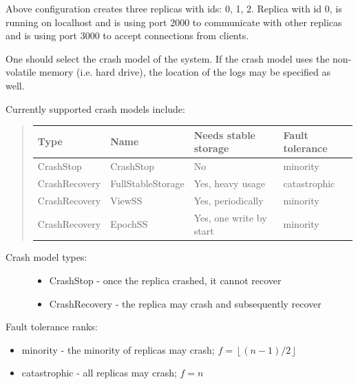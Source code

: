 Above configuration creates three replicas with ids: 0, 1, 2. Replica with id 0,
is running on localhost and is using port 2000 to communicate with other replicas
and is using port 3000 to accept connections from clients.


\label{config:crash-model-selection}
One should select the crash model of the system. If the crash model uses the
non-volatile memory (i.e. hard drive), the location of the logs may be
specified as well.

Currently supported crash models include:
\begin{quote}

\begin{tabular}{|L|L|L|L|}
\hline
\textbf{
Type
} & \textbf{
Name
} & \textbf{
Needs stable storage
} & \textbf{
Fault tolerance
}\\
\hline

CrashStop
 & 
CrashStop
 & 
No
 & 
minority
\\

CrashRecovery
 & 
FullStableStorage
 & 
Yes, heavy usage
 & 
catastrophic
\\

CrashRecovery
 & 
ViewSS
 & 
Yes, periodically
 & 
minority
\\

CrashRecovery
 & 
EpochSS
 & 
Yes, one write by start
 & 
minority
\\
\hline
\end{tabular}

\end{quote}
\begin{description}
\item[{Crash model types:}] \leavevmode\begin{itemize}
\item {} 
CrashStop - once the replica crashed, it cannot recover

\item {} 
CrashRecovery - the replica may crash and subsequently recover

\end{itemize}

\end{description}

Fault tolerance ranks:
\begin{itemize}
\item {} 
minority - the minority of replicas may crash; $f = \left\lfloor (n-1)/2 \right\rfloor$

\item {} 
catastrophic - all replicas may crash; $f=n$

\end{itemize}


